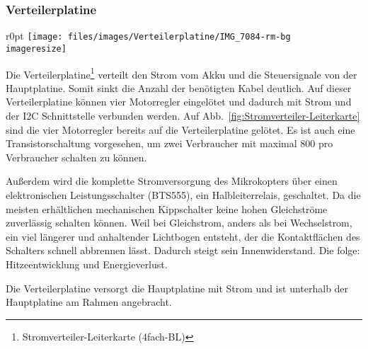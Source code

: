 \subsubsection{Verteilerplatine}
\begin{wrapfigure}{r}{0pt}
	\texttt{[image: files/images/Verteilerplatine/IMG\_7084-rm-bg\\imageresize]}
	\label{fig:Stromverteiler-Leiterkarte}
\end{wrapfigure}

Die Verteilerplatine\footnote{Stromverteiler-Leiterkarte (4fach-BL)}
verteilt den Strom vom Akku
und die Steuersignale von der Hauptplatine.
Somit sinkt die Anzahl der benötigten Kabel deutlich.
Auf dieser Verteilerplatine können vier Motorregler eingelötet
und dadurch mit Strom und der \ac{I2C} Schnittstelle verbunden werden.
Auf Abb.~\vref{fig:Stromverteiler-Leiterkarte} sind
die vier Motorregler bereits auf die Verteilerplatine gelötet.
Es ist auch eine Transistorschaltung vorgesehen,
um zwei Verbraucher mit maximal \unit{800}{\milli\ampere}
pro Verbraucher schalten zu können.

Außerdem wird die komplette Stromversorgung des Mikrokopters über einen
elektronischen Leistungsschalter (BTS555), ein Halbleiterrelais, geschaltet.
Da die meisten erhältlichen mechanischen Kippschalter keine hohen Gleichströme
zuverlässig schalten können.
Weil bei Gleichstrom, anders als bei Wechselstrom,
ein viel längerer und anhaltender Lichtbogen entsteht,
der die Kontaktflächen des Schalters schnell abbrennen lässt.
Dadurch steigt sein Innenwiderstand.
Die folge: Hitzeentwicklung und Energieverlust.

Die Verteilerplatine versorgt die Hauptplatine mit Strom
und ist unterhalb der Hauptplatine am Rahmen angebracht.
